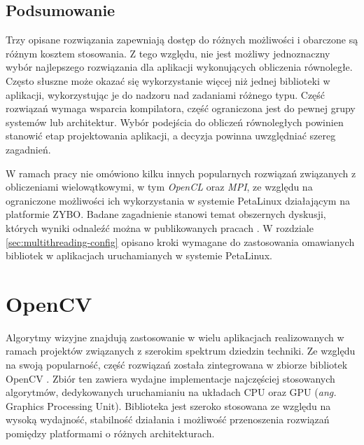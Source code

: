 \subsection*{Podsumowanie}

Trzy opisane rozwiązania zapewniają dostęp do różnych możliwości i obarczone są różnym kosztem stosowania. 
Z tego względu, nie jest możliwy jednoznaczny wybór najlepszego rozwiązania dla aplikacji wykonujących obliczenia równoległe. 
Często słuszne może okazać się wykorzystanie więcej niż jednej biblioteki w aplikacji, wykorzystując je do nadzoru nad zadaniami różnego typu. 
Część rozwiązań wymaga wsparcia kompilatora, część ograniczona jest do pewnej grupy systemów lub architektur. 
Wybór podejścia do obliczeń równoległych powinien stanowić etap projektowania aplikacji, a decyzja powinna uwzględniać szereg zagadnień.

W ramach pracy nie omówiono kilku innych popularnych rozwiązań związanych z obliczeniami wielowątkowymi, w tym \emph{OpenCL} oraz \emph{MPI}, ze względu na ograniczone możliwości ich wykorzystania w systemie PetaLinux działającym na platformie ZYBO.
Badane zagadnienie stanowi temat obszernych dyskusji, których wyniki odnaleźć można w publikowanych pracach \cite{choosing-thread-framework,Kegel2009}. %
W rozdziale \ref{sec:multithreading-config} opisano kroki wymagane do zastosowania omawianych bibliotek w aplikacjach uruchamianych w systemie PetaLinux.


\section{OpenCV}
\label{sec:opencv-lib}

Algorytmy wizyjne znajdują zastosowanie w wielu aplikacjach realizowanych w ramach projektów związanych z szerokim spektrum dziedzin techniki. 
Ze względu na swoją popularność, część rozwiązań została zintegrowana w zbiorze bibliotek OpenCV \cite{opencv-library}. 
Zbiór ten zawiera wydajne implementacje najczęściej stosowanych algorytmów, dedykowanych uruchamianiu na układach CPU oraz GPU (\emph{ang.} Graphics Processing Unit). %
Biblioteka jest szeroko stosowana ze względu na wysoką wydajność, stabilność działania i możliwość przenoszenia rozwiązań pomiędzy platformami o różnych architekturach.

